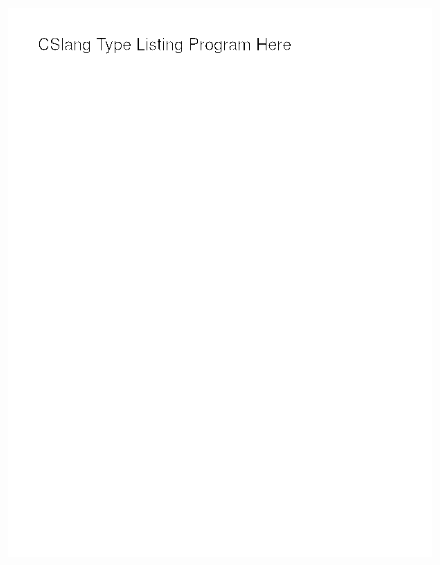 \begin{figure}
  \includegraphics[scale=.30]{images/typelisting}
  \caption{}
  \label{fig:typelisting}
\end{figure}

